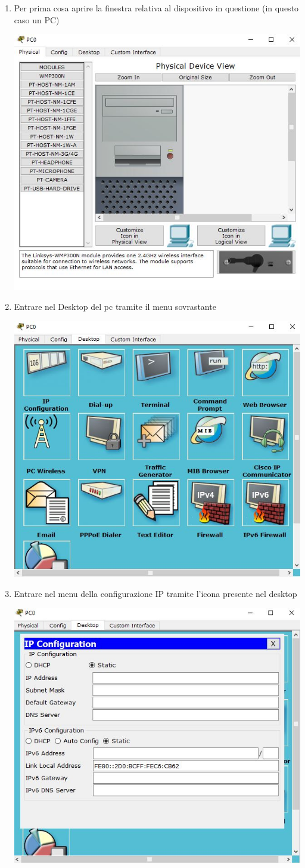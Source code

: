 \begin{enumerate}
    \item Per prima cosa aprire la finestra relativa al dispositivo in questione (in questo caso un PC)\par
    \begin{sfigure}
        \includegraphics[width=0.6\linewidth]{images/07.routing-sicurezza/01.open-pc.jpg}
    \end{sfigure}
    \item Entrare nel Desktop del pc tramite il menu sovrastante\par
    \begin{sfigure}
        \includegraphics[width=0.6\linewidth]{images/07.routing-sicurezza/02.desktop-tab.jpg}
    \end{sfigure}
    \item Entrare nel menu della configurazione IP tramite l’icona presente nel desktop\par
    \begin{sfigure}
        \includegraphics[width=0.6\linewidth]{images/07.routing-sicurezza/03.ip-config.jpg}

\end{sfigure}
\end{enumerate}
